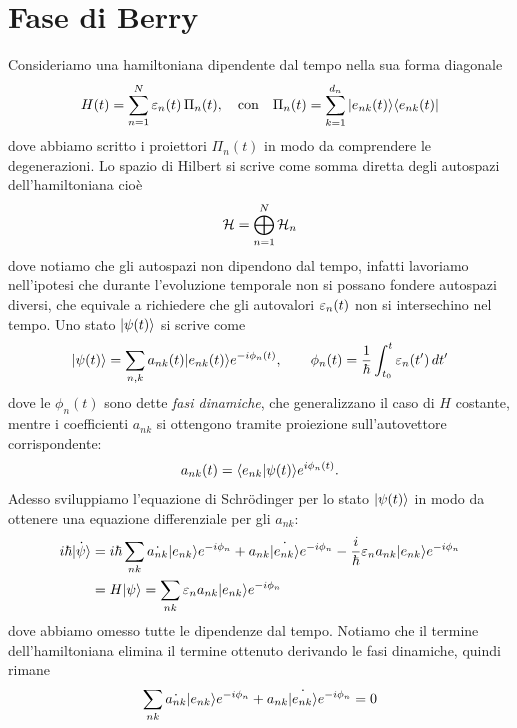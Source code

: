 \section{Fase di Berry}
Consideriamo una hamiltoniana dipendente dal tempo nella sua forma diagonale 
\begin{align*}
  H(t) = \sum_{n = 1}^N \varepsilon_n(t) \, \Pi_n(t), \quad \text{con} \quad \Pi_n(t) = \sum_{k = 1}^{d_n} \vert e_{nk}(t) \rangle \langle e_{nk}(t) \vert 
\end{align*}
dove abbiamo scritto i proiettori $ \Pi_n(t) $ in modo da comprendere le degenerazioni. Lo spazio di Hilbert si scrive come somma diretta degli autospazi
dell'hamiltoniana cioè
\begin{align*}
  \operatorname{\mathcal{H}} = \bigoplus_{n = 1}^N \operatorname{\mathcal{H}}_n
\end{align*}
dove notiamo che gli autospazi non dipendono dal tempo, infatti lavoriamo nell'ipotesi che durante l'evoluzione temporale non si possano fondere autospazi 
diversi, che equivale a richiedere che gli autovalori $ \varepsilon_n(t) $ non si intersechino nel tempo. Uno stato $ \vert \psi(t) \rangle $ si scrive come 
\begin{align*}
  \k{\psi(t)} = \sum_{n,k} a_{nk}(t) \k{e_{nk}(t)} e^{-i \phi_n(t)}, \qquad \phi_n(t) = \frac1\hbar \int_{t_0}^t \eps_n(t') \, dt'
\end{align*}
dove le $ \phi_n(t) $ sono dette \textit{fasi dinamiche}, che generalizzano il caso di $ H $ costante, mentre i coefficienti $ a_{nk} $ si ottengono 
tramite proiezione sull'autovettore corrispondente:
\begin{align*}
  a_{nk}(t) = \bk{e_{nk} | \psi(t)} e^{i\phi_n(t)}.
\end{align*}
Adesso sviluppiamo l'equazione di Schrödinger per lo stato $ \vert \psi(t) \rangle $ in modo da ottenere una equazione differenziale per gli $ a_{nk} $:
\begin{align*}
  i\hbar \dot{\k{\psi}} &= i\hbar \sum_{nk} \dot{a_{nk}} \k{e_{nk}} e^{-i \phi_n} + a_{nk} \dot{\k{e_{nk}}} e^{-i \phi_n} 
  - \frac{i}\hbar \eps_n a_{nk} \k{e_{nk}} e^{-i \phi_n}
  \\
  &= H \k{\psi} = \sum_{nk} \eps_n a_{nk} \k{e_{nk}} e^{-i \phi_n}
\end{align*}
dove abbiamo omesso tutte le dipendenze dal tempo. Notiamo che il termine dell'hamiltoniana elimina il termine ottenuto derivando le fasi dinamiche, 
quindi rimane
\begin{align*}
  \sum_{nk} \dot{a_{nk}} \k{e_{nk}} e^{-i \phi_n} + a_{nk} \dot{\k{e_{nk}}} e^{-i \phi_n} = 0
\end{align*}
